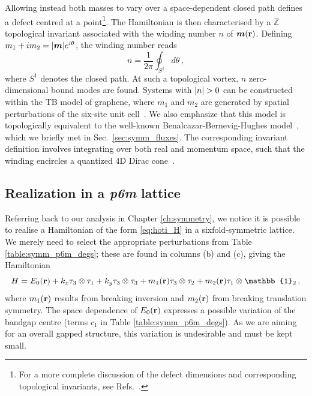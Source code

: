 Allowing instead both masses to vary over a space-dependent closed path defines a defect centred at a point\footnote{For a more complete discussion of the defect dimensions and corresponding topological invariants, see Refs.~\cite{Kosata_2021, Teo_2010}.}. The Hamiltonian is then characterised by a $\mathbb{Z}$ topological invariant associated with the winding number $n$ of $\boldsymbol{m}(\vb{r})$. Defining $m_1 + i m_2 = \abs{\boldsymbol{m}} e^{i \theta}$, the winding number reads
\begin{equation} \label{eq:invariant}
n = \frac{1}{2\pi} \oint_{S^1} d\theta\,,
\end{equation}
where $S^1$ denotes the closed path. At such a topological vortex, $n$ zero-dimensional bound modes are found. Systems with $\abs{n} > 0$ can be constructed within the TB model of graphene, where $m_1$ and $m_2$ are generated by spatial perturbations of the six-site unit cell~\cite{Hou_2007}. We also emphasize that this model is topologically equivalent to the well-known Benalcazar-Bernevig-Hughes model~\cite{Fukui_2019}, which we briefly met in Sec.~\ref{sec:symm_fluxes}. The corresponding invariant definition involves integrating over both real and momentum space, such that the winding encircles a quantized 4D Dirac cone~\cite{Petrides_2020}.

\subsection{Realization in a \textit{p6m} lattice}

Referring back to our analysis in Chapter \ref{ch:symmetry}, we notice it is possible to realise a Hamiltonian of the form \eqref{eq:hoti_H} in a sixfold-symmetric lattice. We merely need to select the appropriate perturbations from Table \ref{table:symm_p6m_degs}; these are found in columns (b) and (c), giving the Hamiltonian
\begin{equation} \label{eq:hoti_H_4band}
H = E_0(\vb{r}) + k_x  \tau_3 \otimes \tau_1 + k_y  \tau_3 \otimes \tau_3 + m_1(\vb{r})  \tau_3 \otimes \tau_2 + m_2(\vb{r})  \tau_1  \otimes \mathbb{1}_2 \,,
\end{equation}
where $m_1(\vb{r})$ results from breaking inversion and $m_2(\vb{r})$ from breaking translation symmetry. The space dependence of $E_0(\vb{r})$ expresses a possible variation of the bandgap centre (terms $c_1$ in Table \ref{table:symm_p6m_degs}). As we are aiming for an overall gapped structure, this variation is undesirable and must be kept small.

